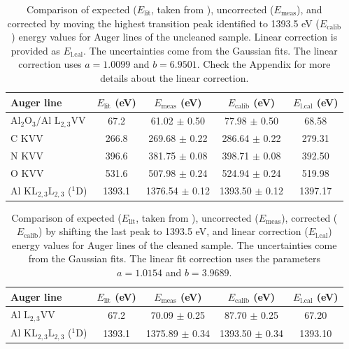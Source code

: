 \documentclass[12pt]{article}
\begin{document}
\begin{table}[h!]
    \centering
    \begin{tabular}{lcccc}
        \toprule
        \textbf{Auger line} & \textbf{\(E_{\text{lit}}\) (eV)} & \textbf{\(E_{\text{meas}}\) (eV)} & \textbf{\(E_{\text{calib}}\) (eV)} & \textbf{\(E_{\text{l.cal}}\) (eV)} \\
        \midrule
        $\text{Al}_2\text{O}_3\text{/Al}$ $\text{L}_{2,3}$VV & 67.2 & 61.02 $\pm$ 0.50 & 77.98 $\pm$ 0.50 & 68.58 \\
        C KVV & 266.8 & 269.68 $\pm$ 0.22 & 286.64 $\pm$ 0.22 & 279.31 \\
        N KVV & 396.6 & 381.75 $\pm$ 0.08 & 398.71 $\pm$ 0.08 & 392.50 \\
        O KVV & 531.6 & 507.98 $\pm$ 0.24 & 524.94 $\pm$ 0.24 & 519.98 \\
        Al $\text{KL}_{2,3} \text{L}_{2,3}$ ($^{1}$D) & 1393.1 & 1376.54 $\pm$ 0.12 & 1393.50 $\pm$ 0.12 & 1397.17 \\
        \bottomrule
    \end{tabular}
    \caption{Comparison of expected (\(E_{\text{lit}}\), taken from \cite{palmberg1991handbook}), uncorrected (\(E_{\text{meas}}\)), and corrected by moving the highest transition peak identified to 1393.5 eV (\(E_{\text{calib}}\)) energy values for Auger lines of the uncleaned sample. Linear correction is provided as \(E_{\text{l.cal}}\). The uncertainties come from the Gaussian fits. The linear correction uses $a = 1.0099$ and  $b = 6.9501$. Check the Appendix for more details about the linear correction.}
    \label{tab:alpeaks}
\end{table}
\begin{table}[h!]
    \centering
    \begin{tabular}{lcccc}
        \toprule
        \textbf{Auger line} & \textbf{\(E_{\text{lit}}\) (eV)} & \textbf{\(E_{\text{meas}}\) (eV)} & \textbf{\(E_{\text{calib}}\) (eV)} & \textbf{\(E_{\text{l.cal}}\) (eV)} \\
        \midrule
        Al $\text{L}_{2,3}$VV & 67.2 & 70.09 $\pm$ 0.25 & 87.70 $\pm$ 0.25 & 67.20 \\
        Al $\text{KL}_{2,3} \text{L}_{2,3}$ ($^{1}$D) & 1393.1 & 1375.89 $\pm$ 0.34 & 1393.50 $\pm$ 0.34 & 1393.10 \\
        \bottomrule
    \end{tabular}
    \caption{Comparison of expected (\(E_{\text{lit}}\), taken from \cite{palmberg1991handbook}), uncorrected (\(E_{\text{meas}}\)), corrected (\(E_{\text{calib}}\)) by shifting the last peak to 1393.5 eV, and linear correction (\(E_{\text{l.cal}}\)) energy values for Auger lines of the cleaned sample. The uncertainties come from the Gaussian fits. The linear fit correction uses the parameters $a = 1.0154$ and $b = 3.9689$.}
    \label{tab:alpeaksclean}
\end{table}
\end{document}
